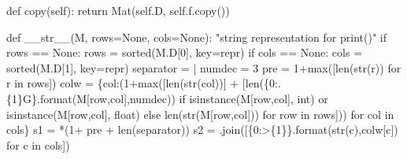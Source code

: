 \documentclass[
  letterpaper,
  DIV=11,
  numbers=noendperiod]{scrartcl}
\newenvironment{Shaded}{\begin{snugshade}}{\end{snugshade}}
\newcommand{\BuiltInTok}[1]{\textcolor[rgb]{0.00,0.23,0.31}{#1}}
\newcommand{\CommentTok}[1]{\textcolor[rgb]{0.37,0.37,0.37}{#1}}
\newcommand{\ControlFlowTok}[1]{\textcolor[rgb]{0.00,0.23,0.31}{#1}}
\newcommand{\DecValTok}[1]{\textcolor[rgb]{0.68,0.00,0.00}{#1}}
\newcommand{\FunctionTok}[1]{\textcolor[rgb]{0.28,0.35,0.67}{#1}}
\newcommand{\KeywordTok}[1]{\textcolor[rgb]{0.00,0.23,0.31}{#1}}
\newcommand{\NormalTok}[1]{\textcolor[rgb]{0.00,0.23,0.31}{#1}}
\newcommand{\OperatorTok}[1]{\textcolor[rgb]{0.37,0.37,0.37}{#1}}
\newcommand{\SpecialCharTok}[1]{\textcolor[rgb]{0.37,0.37,0.37}{#1}}
\newcommand{\StringTok}[1]{\textcolor[rgb]{0.13,0.47,0.30}{#1}}
\newcommand{\VariableTok}[1]{\textcolor[rgb]{0.07,0.07,0.07}{#1}}
\begin{document}
\begin{Shaded}
\begin{Highlighting}[numbers=left,,]
    \KeywordTok{def}\NormalTok{ copy(}\VariableTok{self}\NormalTok{):}
        \ControlFlowTok{return}\NormalTok{ Mat(}\VariableTok{self}\NormalTok{.D, }\VariableTok{self}\NormalTok{.f.copy())}

    \KeywordTok{def} \FunctionTok{\_\_str\_\_}\NormalTok{(M, rows}\OperatorTok{=}\VariableTok{None}\NormalTok{, cols}\OperatorTok{=}\VariableTok{None}\NormalTok{):}
        \CommentTok{"string representation for print()"}
        \ControlFlowTok{if}\NormalTok{ rows }\OperatorTok{==} \VariableTok{None}\NormalTok{: rows }\OperatorTok{=} \BuiltInTok{sorted}\NormalTok{(M.D[}\DecValTok{0}\NormalTok{], key}\OperatorTok{=}\BuiltInTok{repr}\NormalTok{)}
        \ControlFlowTok{if}\NormalTok{ cols }\OperatorTok{==} \VariableTok{None}\NormalTok{: cols }\OperatorTok{=} \BuiltInTok{sorted}\NormalTok{(M.D[}\DecValTok{1}\NormalTok{], key}\OperatorTok{=}\BuiltInTok{repr}\NormalTok{)}
\NormalTok{        separator }\OperatorTok{=} \StringTok{\textquotesingle{} | \textquotesingle{}}
\NormalTok{        numdec }\OperatorTok{=} \DecValTok{3}
\NormalTok{        pre }\OperatorTok{=} \DecValTok{1}\OperatorTok{+}\BuiltInTok{max}\NormalTok{([}\BuiltInTok{len}\NormalTok{(}\BuiltInTok{str}\NormalTok{(r)) }\ControlFlowTok{for}\NormalTok{ r }\KeywordTok{in}\NormalTok{ rows])}
\NormalTok{        colw }\OperatorTok{=}\NormalTok{ \{col:(}\DecValTok{1}\OperatorTok{+}\BuiltInTok{max}\NormalTok{([}\BuiltInTok{len}\NormalTok{(}\BuiltInTok{str}\NormalTok{(col))] }\OperatorTok{+}\NormalTok{ [}\BuiltInTok{len}\NormalTok{(}\StringTok{\textquotesingle{}\{0:.}\SpecialCharTok{\{1\}}\StringTok{G\}\textquotesingle{}}\NormalTok{.}\BuiltInTok{format}\NormalTok{(M[row,col],numdec)) }\ControlFlowTok{if} \BuiltInTok{isinstance}\NormalTok{(M[row,col], }\BuiltInTok{int}\NormalTok{) }\KeywordTok{or} \BuiltInTok{isinstance}\NormalTok{(M[row,col], }\BuiltInTok{float}\NormalTok{) }\ControlFlowTok{else} \BuiltInTok{len}\NormalTok{(}\BuiltInTok{str}\NormalTok{(M[row,col])) }\ControlFlowTok{for}\NormalTok{ row }\KeywordTok{in}\NormalTok{ rows])) }\ControlFlowTok{for}\NormalTok{ col }\KeywordTok{in}\NormalTok{ cols\}}
\NormalTok{        s1 }\OperatorTok{=} \StringTok{\textquotesingle{} \textquotesingle{}}\OperatorTok{*}\NormalTok{(}\DecValTok{1}\OperatorTok{+}\NormalTok{ pre }\OperatorTok{+} \BuiltInTok{len}\NormalTok{(separator))}
\NormalTok{        s2 }\OperatorTok{=} \StringTok{\textquotesingle{}\textquotesingle{}}\NormalTok{.join([}\StringTok{\textquotesingle{}\{0:\textgreater{}}\SpecialCharTok{\{1\}}\StringTok{\}\textquotesingle{}}\NormalTok{.}\BuiltInTok{format}\NormalTok{(}\BuiltInTok{str}\NormalTok{(c),colw[c]) }\ControlFlowTok{for}\NormalTok{ c }\KeywordTok{in}\NormalTok{ cols])}

\end{Highlighting}
\end{Shaded}
\end{document}
